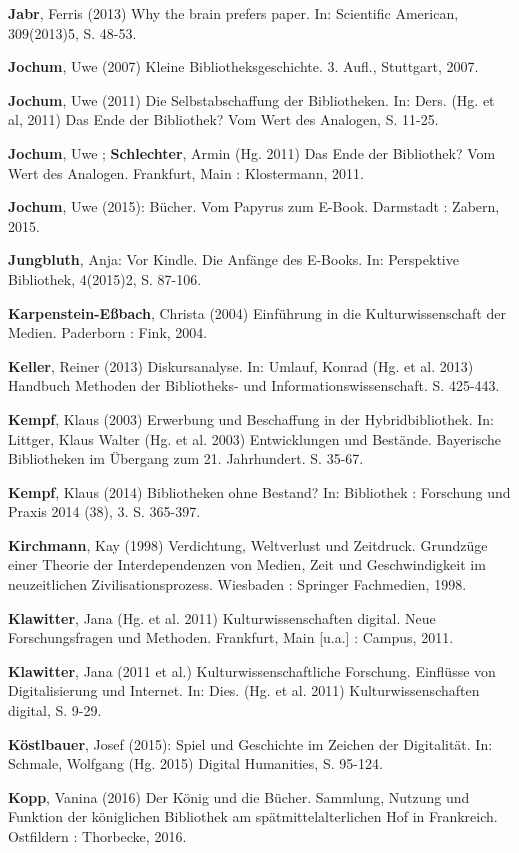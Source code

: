 \documentclass[a4paper,
fontsize=11pt,
oneside,
numbers=noperiodatend,
parskip=half-,
bibliography=totoc,
final
]{scrartcl}
\begin{document}
\textbf{Jabr}, Ferris (2013) Why the brain prefers paper. In: Scientific
American, 309(2013)5, S. 48-53.

\textbf{Jochum}, Uwe (2007) Kleine Bibliotheksgeschichte. 3. Aufl.,
Stuttgart, 2007.

\textbf{Jochum}, Uwe (2011) Die Selbstabschaffung der Bibliotheken. In:
Ders. (Hg. et al, 2011) Das Ende der Bibliothek? Vom Wert des Analogen,
S. 11-25.

\textbf{Jochum}, Uwe ; \textbf{Schlechter}, Armin (Hg. 2011) Das Ende
der Bibliothek? Vom Wert des Analogen. Frankfurt, Main : Klostermann,
2011.

\textbf{Jochum}, Uwe (2015): Bücher. Vom Papyrus zum E-Book. Darmstadt :
Zabern, 2015.

\textbf{Jungbluth}, Anja: Vor Kindle. Die Anfänge des E-Books. In:
Perspektive Bibliothek, 4(2015)2, S. 87-106.

\textbf{Karpenstein-Eßbach}, Christa (2004) Einführung in die
Kulturwissenschaft der Medien. Paderborn : Fink, 2004.

\textbf{Keller}, Reiner (2013) Diskursanalyse. In: Umlauf, Konrad (Hg.
et al. 2013) Handbuch Methoden der Bibliotheks- und
Informationswissenschaft. S. 425-443.

\textbf{Kempf}, Klaus (2003) Erwerbung und Beschaffung in der
Hybridbibliothek. In: Littger, Klaus Walter (Hg. et al. 2003)
Entwicklungen und Bestände. Bayerische Bibliotheken im Übergang zum 21.
Jahrhundert. S. 35-67.

\textbf{Kempf}, Klaus (2014) Bibliotheken ohne Bestand? In: Bibliothek :
Forschung und Praxis 2014 (38), 3. S. 365-397.

\textbf{Kirchmann}, Kay (1998) Verdichtung, Weltverlust und Zeitdruck.
Grundzüge einer Theorie der Interdependenzen von Medien, Zeit und
Geschwindigkeit im neuzeitlichen Zivilisationsprozess. Wiesbaden :
Springer Fachmedien, 1998.

\textbf{Klawitter}, Jana (Hg. et al. 2011) Kulturwissenschaften digital.
Neue Forschungsfragen und Methoden. Frankfurt, Main {[}u.a.{]} : Campus,
2011.

\textbf{Klawitter}, Jana (2011 et al.) Kulturwissenschaftliche
Forschung. Einflüsse von Digitalisierung und Internet. In: Dies. (Hg. et
al. 2011) Kulturwissenschaften digital, S. 9-29.

\textbf{Köstlbauer}, Josef (2015): Spiel und Geschichte im Zeichen der
Digitalität. In: Schmale, Wolfgang (Hg. 2015) Digital Humanities, S.
95-124.

\textbf{Kopp}, Vanina (2016) Der König und die Bücher. Sammlung, Nutzung
und Funktion der königlichen Bibliothek am spätmittelalterlichen Hof in
Frankreich. Ostfildern : Thorbecke, 2016.
\end{document}
